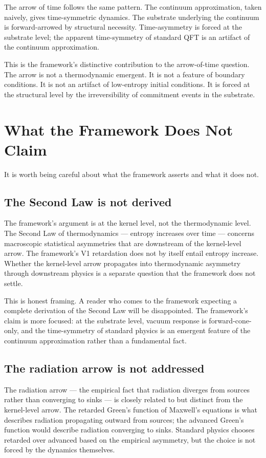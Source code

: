 \documentclass[11pt,a4paper]{article}
\begin{document}
The arrow of time follows the same pattern. The continuum approximation, taken naively, gives time-symmetric dynamics. The substrate underlying the continuum is forward-arrowed by structural necessity. Time-asymmetry is forced at the substrate level; the apparent time-symmetry of standard QFT is an artifact of the continuum approximation.

This is the framework's distinctive contribution to the arrow-of-time question. The arrow is not a thermodynamic emergent. It is not a feature of boundary conditions. It is not an artifact of low-entropy initial conditions. It is forced at the structural level by the irreversibility of commitment events in the substrate.

\section{What the Framework Does Not Claim}

It is worth being careful about what the framework asserts and what it does not.

\subsection{The Second Law is not derived}

The framework's argument is at the kernel level, not the thermodynamic level. The Second Law of thermodynamics --- entropy increases over time --- concerns macroscopic statistical asymmetries that are downstream of the kernel-level arrow. The framework's V1 retardation does not by itself entail entropy increase. Whether the kernel-level arrow propagates into thermodynamic asymmetry through downstream physics is a separate question that the framework does not settle.

This is honest framing. A reader who comes to the framework expecting a complete derivation of the Second Law will be disappointed. The framework's claim is more focused: at the substrate level, vacuum response is forward-cone-only, and the time-symmetry of standard physics is an emergent feature of the continuum approximation rather than a fundamental fact.

\subsection{The radiation arrow is not addressed}

The radiation arrow --- the empirical fact that radiation diverges from sources rather than converging to sinks --- is closely related to but distinct from the kernel-level arrow. The retarded Green's function of Maxwell's equations is what describes radiation propagating outward from sources; the advanced Green's function would describe radiation converging to sinks. Standard physics chooses retarded over advanced based on the empirical asymmetry, but the choice is not forced by the dynamics themselves.
\end{document}
